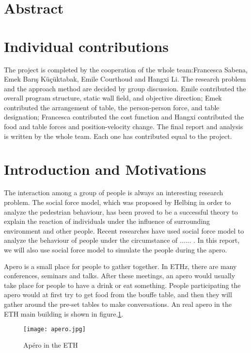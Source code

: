 \documentclass[11pt]{article}
\begin{document}



\section{Abstract}

\section{Individual contributions}

The project is completed by the cooperation of the whole team:Francesca Sabena, Emek Barış Küçüktabak, Emile Courthoud and Hangxi Li. The research problem and the approach method are decided by group discussion. Emile contributed the overall program structure, static wall field, and objective direction; Emek contributed the arrangement of table, the person-person force, and table designation; Francesca contributed the cost function and Hangxi contributed the food and table forces and position-velocity change. The final report and analysis is written by the whole team. Each one has contributed equal to the project.

\section{Introduction and Motivations}
The interaction among a group of people is always an interesting research problem. The social force model, which was proposed by Helbing\citep{Socialforce} in order to analyze the pedestrian behaviour, has been proved to be a successful theory to explain the reaction of individuals under the influence of surrounding environment and other people. Recent researches have used social force model to analyze the behaviour of people under the circumstance of ...... \citep{}. In this report, we will also use social force model to simulate the people during the apero. 

Apero is a small place for people to gather together. In ETHz, there are many conferences, seminars and talks. After these meetings, an apero would usually take place for people to have a drink or eat something. People participating the apero would at first try to get food from the bouffe table, and then they will gather around the pre-set tables to make conversations. An real apero in the ETH main building is shown in figure.\ref{fig:apero}.

\begin{figure}[h!]
\centering
\texttt{[image: apero.jpg]}
\caption{Apéro in the ETH}
\label{fig:apero}
\end{figure}
\end{document}
